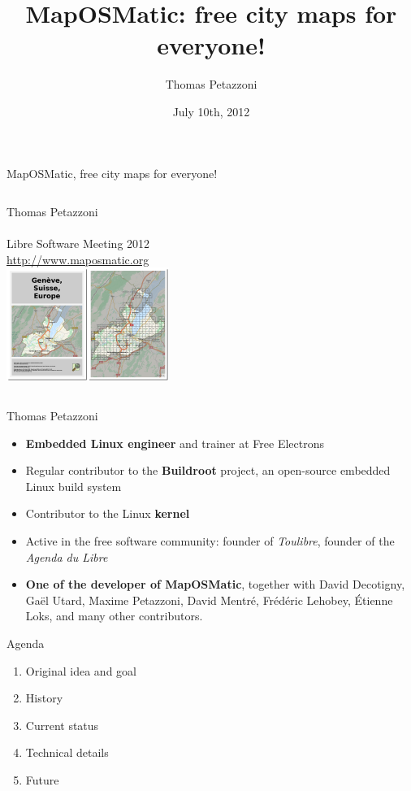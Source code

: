 \documentclass{beamer}
\title{MapOSMatic: free city maps for everyone!}
\author{Thomas {\sc Petazzoni}}
\date{July 10th, 2012}
\begin{document}

\begin{frame}
  \begin{center}
    \Huge
    MapOSMatic, free city maps for everyone!\\
    \vspace{2cm}
    \begin{columns}
      \normalsize
      Thomas Petazzoni\\
      \\
      Libre Software Meeting 2012\\
      \url{http://www.maposmatic.org}\\
      \includegraphics[height=0.3\textheight]{geneve-small.png}
    \end{columns}
  \end{center}
\end{frame}

\begin{frame}{Thomas Petazzoni}
  \begin{itemize}
  \item {\bf Embedded Linux engineer} and trainer at Free Electrons
  \item Regular contributor to the {\bf Buildroot} project, an open-source
    embedded Linux build system
  \item Contributor to the Linux {\bf kernel}
  \item Active in the free software community: founder of {\em
      Toulibre}, founder of the {\em Agenda du Libre}
  \item {\bf One of the developer of MapOSMatic}, together with
    David Decotigny, Gaël Utard, Maxime Petazzoni, David Mentré,
    Frédéric Lehobey, Étienne Loks, and many other contributors.
  \end{itemize}
\end{frame}

\begin{frame}{Agenda}
  \begin{enumerate}
  \item Original idea and goal
  \item History
  \item Current status
  \item Technical details
  \item Future
  \end{enumerate}
\end{frame}
\end{document}
